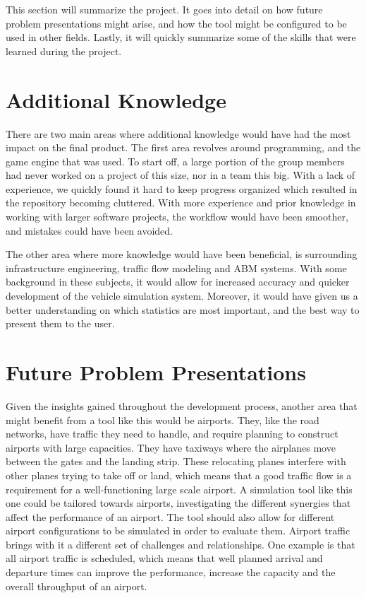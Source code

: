 This section will summarize the project. It goes into detail on how future problem presentations might arise, and how the tool might be configured to be used in other fields. Lastly, it will quickly summarize some of the skills that were learned during the project.


    \section{Additional Knowledge}
        There are two main areas where additional knowledge would have had the most impact on the final product. The first area revolves around programming, and the game engine that was used. To start off, a large portion of the group members had never worked on a project of this size, nor in a team this big. With a lack of experience, we quickly found it hard to keep progress organized which resulted in the repository becoming cluttered. With more experience and prior knowledge in working with larger software projects, the workflow would have been smoother, and mistakes could have been avoided.

        The other area where more knowledge would have been beneficial, is surrounding infrastructure engineering, traffic flow modeling and ABM systems. With some background in these subjects, it would allow for increased accuracy and quicker development of the vehicle simulation system. Moreover, it would have given us a better understanding on which statistics are most important, and the best way to present them to the user.

    \section{Future Problem Presentations}
        Given the insights gained throughout the development process, another area that might benefit from a tool like this would be airports. They, like the road networks, have traffic they need to handle, and require planning to construct airports with large capacities. They have taxiways where the airplanes move between the gates and the landing strip. These relocating planes interfere with other planes trying to take off or land, which means that a good traffic flow is a requirement for a well-functioning large scale airport. A simulation tool like this one could be tailored towards airports, investigating the different synergies that affect the performance of an airport. The tool should also allow for different airport configurations to be simulated in order to evaluate them. Airport traffic brings with it a different set of challenges and relationships. One example is that all airport traffic is scheduled, which means that well planned arrival and departure times can improve the performance, increase the capacity and the overall throughput of an airport.


